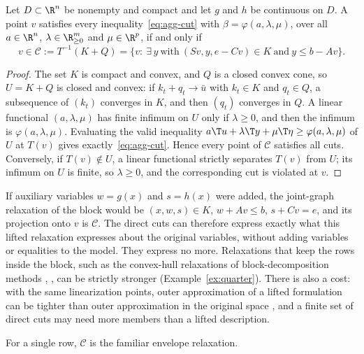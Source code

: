 \begin{theorem}\label{thm:closure}
Let $D\subset\R^n$ be nonempty and compact and let $g$ and $h$ be
continuous on $D$. A point $v$ satisfies every inequality~\eqref{eq:agg-cut}
with $\beta=\varphi(a,\lambda,\mu)$, over all $a\in\R^n$,
$\lambda\in\R^m_{\ge0}$ and $\mu\in\R^p$, if and only if
\begin{equation}\label{eq:closure}
v\in\mathcal C:=T^{-1}(K+Q)=\bigl\{v:\ \exists\,y\ \text{with}\ (Sv,y,e-Cv)\in K\ \text{and}\ y\le b-Av\bigr\}.
\end{equation}
\end{theorem}

\begin{proof}
The set $K$ is compact and convex, and $Q$ is a closed convex cone, so
$U=K+Q$ is closed and convex: if $k_t+q_t\to\bar u$ with $k_t\in K$ and
$q_t\in Q$, a subsequence of $(k_t)$ converges in $K$, and then $(q_t)$
converges in $Q$. A linear functional $(a,\lambda,\mu)$ has finite
infimum on $U$ only if $\lambda\ge0$, and then the infimum is
$\varphi(a,\lambda,\mu)$. Evaluating the valid inequality
$a\T u+\lambda\T y+\mu\T\eta\ge\varphi(a,\lambda,\mu)$ of $U$ at $T(v)$
gives exactly~\eqref{eq:agg-cut}. Hence every point of $\mathcal C$ satisfies all
cuts. Conversely, if $T(v)\notin U$, a linear functional strictly
separates $T(v)$ from $U$; its infimum on $U$ is finite, so
$\lambda\ge0$, and the corresponding cut is violated at $v$.
\end{proof}

If auxiliary variables $w=g(x)$ and $s=h(x)$ were added, the joint-graph
relaxation of the block would be $(x,w,s)\in K$, $w+Av\le b$, $s+Cv=e$,
and its projection onto $v$ is $\mathcal C$. The direct cuts can therefore express
exactly what this lifted relaxation expresses about the original
variables, without adding variables or equalities to the model. They
express no more. Relaxations that keep the rows inside the block, such as
the convex-hull relaxations of block-decomposition methods
\citep[Section~3]{Nowak2005}, \citep{WuMutsNowakHendrix2025}, can be
strictly stronger (Example~\ref{ex:quarter}). There is also a cost: with
the same linearization points, outer approximation of a lifted
formulation can be tighter than outer approximation in the original
space \citep{TawarmalaniSahinidis2005}, and a finite set of direct cuts
may need more members than a lifted description.

For a single row, $\mathcal C$ is the familiar envelope relaxation.

